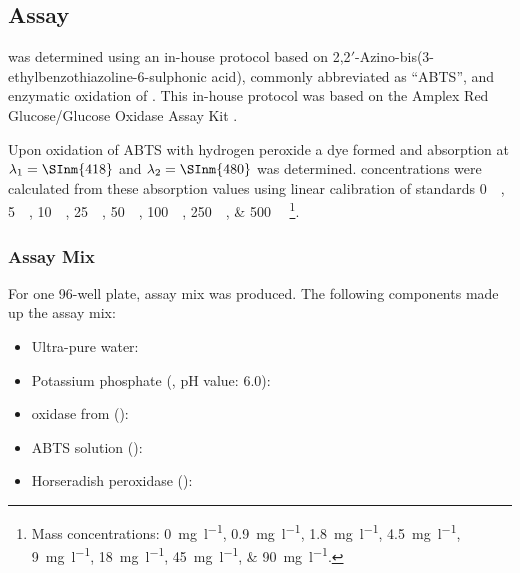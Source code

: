 \subsection{\GLC{} Assay\label{subsec-glc-assay}}
\GLC{} was determined using an in-house protocol \cite{Ruehmann2015a} based on 2,2$'$-Azino-bis(3-eth\-yl\-ben\-zo\-thi\-a\-zoline-6-sul\-phon\-ic acid), commonly abbreviated as \enquote{ABTS}, and enzymatic oxidation of \glc{}. This in-house protocol was based on the Amplex Red Glucose/Glucose Oxidase Assay Kit \cite{Invitrogen2006}.

Upon oxidation of ABTS with hydrogen peroxide a dye formed and absorption at $\lambda{}_1 = \SInm{418}$ and $\lambda{}_2 = \SInm{480}$ was determined. \GLC{} concentrations were calculated from these absorption values using linear calibration of standards \SIlist{0;5;10;25;50;100;250;500}{\micro\M} \glc{}\footnote{Mass concentrations: \SIlist{0;0.9;1.8;4.5;9;18;45;90}{\milli\gram\per\litre}.}.

\subsubsection{Assay Mix}
For one 96-well plate,  assay mix was produced. The following components made up the assay mix:
\begin{itemize}
	\item Ultra-pure water: 
	\item Potassium phosphate (, pH value: \num{6.0}): 
	\item \GLC{} oxidase from  (): 
	\item ABTS solution (): 
	\item Horseradish peroxidase (): 
\end{itemize}

